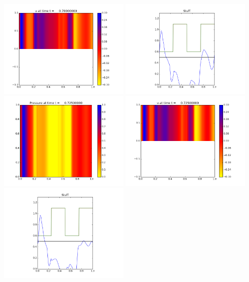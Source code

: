\documentclass[11pt]{article}
\begin{document}
\includegraphics[width=0.475\textwidth]{frame0028fig1.png}
\vskip 10pt 
\includegraphics[width=0.475\textwidth]{frame0028fig3.png}
\vskip 10pt 
\includegraphics[width=0.475\textwidth]{frame0029fig0.png}
\includegraphics[width=0.475\textwidth]{frame0029fig1.png}
\vskip 10pt 
\includegraphics[width=0.475\textwidth]{frame0029fig3.png}
\end{document}
